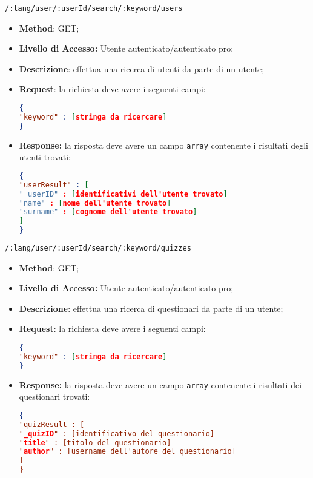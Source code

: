 	\item \texttt{/:lang/user/:userId/search/:keyword/users}
	 \begin{itemize}
	 	\item \textbf{Method}: GET;
	 	\item \textbf{Livello di Accesso:} Utente autenticato/autenticato pro;
	 	\item \textbf{Descrizione}: effettua una ricerca di utenti da parte di un utente;
	 	\item \textbf{Request}: la richiesta deve avere i seguenti campi:
\begin{lstlisting}[language=json,firstnumber=1]
{
"keyword" : [stringa da ricercare]
}
\end{lstlisting} 
		\item \textbf{Response:} la risposta deve avere un campo \texttt{array} contenente i risultati degli utenti trovati:
\begin{lstlisting}[language=json,firstnumber=1]
{
"userResult" : [
"_userID" : [identificativi dell'utente trovato]
"name" : [nome dell'utente trovato]
"surname" : [cognome dell'utente trovato]
]
}
\end{lstlisting}
	 \end{itemize}

\item \texttt{/:lang/user/:userId/search/:keyword/quizzes}
	 \begin{itemize}
	 	\item \textbf{Method}: GET;
	 	\item \textbf{Livello di Accesso:} Utente autenticato/autenticato pro;
	 	\item \textbf{Descrizione}: effettua una ricerca di questionari da parte di un utente;
	 	\item \textbf{Request}: la richiesta deve avere i seguenti campi:
\begin{lstlisting}[language=json,firstnumber=1]
{
"keyword" : [stringa da ricercare]
}
\end{lstlisting} 
		\item \textbf{Response:} la risposta deve avere un campo \texttt{array} contenente i risultati dei questionari trovati:
\begin{lstlisting}[language=json,firstnumber=1]
{
"quizResult : [
"_quizID" : [identificativo del questionario]
"title" : [titolo del questionario]
"author" : [username dell'autore del questionario]
]
}
\end{lstlisting}
	 \end{itemize}	 
	 
